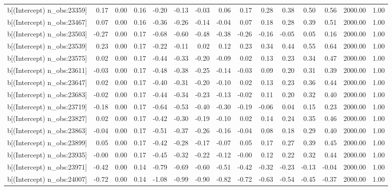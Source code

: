 \begin{table}[ht]
\begin{tabular}{rrrrrrrrrrrrrrr}
  b[(Intercept) n\_obs:23359] & 0.17 & 0.00 & 0.16 & -0.20 & -0.13 & -0.03 & 0.06 & 0.17 & 0.28 & 0.38 & 0.50 & 0.56 & 2000.00 & 1.00 \\ 
  b[(Intercept) n\_obs:23467] & 0.07 & 0.00 & 0.16 & -0.36 & -0.26 & -0.14 & -0.04 & 0.07 & 0.18 & 0.28 & 0.39 & 0.51 & 2000.00 & 1.00 \\ 
  b[(Intercept) n\_obs:23503] & -0.27 & 0.00 & 0.17 & -0.68 & -0.60 & -0.48 & -0.38 & -0.26 & -0.16 & -0.05 & 0.05 & 0.16 & 2000.00 & 1.00 \\ 
  b[(Intercept) n\_obs:23539] & 0.23 & 0.00 & 0.17 & -0.22 & -0.11 & 0.02 & 0.12 & 0.23 & 0.34 & 0.44 & 0.55 & 0.64 & 2000.00 & 1.00 \\ 
  b[(Intercept) n\_obs:23575] & 0.02 & 0.00 & 0.17 & -0.44 & -0.33 & -0.20 & -0.09 & 0.02 & 0.13 & 0.23 & 0.34 & 0.47 & 2000.00 & 1.00 \\ 
  b[(Intercept) n\_obs:23611] & -0.03 & 0.00 & 0.17 & -0.48 & -0.38 & -0.25 & -0.14 & -0.03 & 0.09 & 0.20 & 0.31 & 0.39 & 2000.00 & 1.00 \\ 
  b[(Intercept) n\_obs:23647] & 0.02 & 0.00 & 0.17 & -0.40 & -0.31 & -0.20 & -0.10 & 0.02 & 0.13 & 0.23 & 0.36 & 0.44 & 2000.00 & 1.00 \\ 
  b[(Intercept) n\_obs:23683] & -0.02 & 0.00 & 0.17 & -0.44 & -0.34 & -0.23 & -0.13 & -0.02 & 0.11 & 0.20 & 0.32 & 0.40 & 2000.00 & 1.00 \\ 
  b[(Intercept) n\_obs:23719] & -0.18 & 0.00 & 0.17 & -0.64 & -0.53 & -0.40 & -0.30 & -0.19 & -0.06 & 0.04 & 0.15 & 0.23 & 2000.00 & 1.00 \\ 
  b[(Intercept) n\_obs:23827] & 0.02 & 0.00 & 0.17 & -0.42 & -0.30 & -0.19 & -0.10 & 0.02 & 0.14 & 0.24 & 0.35 & 0.46 & 2000.00 & 1.00 \\ 
  b[(Intercept) n\_obs:23863] & -0.04 & 0.00 & 0.17 & -0.51 & -0.37 & -0.26 & -0.16 & -0.04 & 0.08 & 0.18 & 0.29 & 0.40 & 2000.00 & 1.00 \\ 
  b[(Intercept) n\_obs:23899] & 0.05 & 0.00 & 0.17 & -0.42 & -0.28 & -0.17 & -0.07 & 0.05 & 0.17 & 0.27 & 0.39 & 0.45 & 2000.00 & 1.00 \\ 
  b[(Intercept) n\_obs:23935] & -0.00 & 0.00 & 0.17 & -0.45 & -0.32 & -0.22 & -0.12 & -0.00 & 0.12 & 0.22 & 0.32 & 0.44 & 2000.00 & 1.00 \\ 
  b[(Intercept) n\_obs:23971] & -0.42 & 0.00 & 0.14 & -0.79 & -0.69 & -0.60 & -0.51 & -0.42 & -0.32 & -0.23 & -0.13 & -0.04 & 2000.00 & 1.00 \\ 
  b[(Intercept) n\_obs:24007] & -0.72 & 0.00 & 0.14 & -1.08 & -0.99 & -0.90 & -0.82 & -0.72 & -0.63 & -0.54 & -0.45 & -0.37 & 2000.00 & 1.00 \\ 

\end{tabular}
\end{table}
